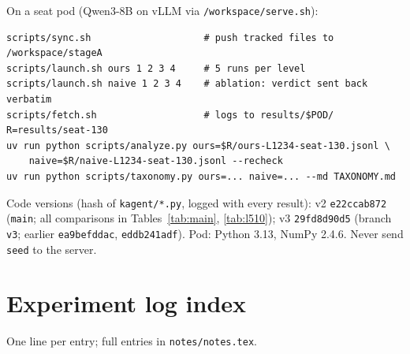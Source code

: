 \documentclass[11pt]{article}
\newcommand{\code}[1]{\texttt{#1}}
\begin{document}
\noindent On a seat pod (Qwen3-8B on vLLM via \code{/workspace/serve.sh}):

\begin{small}
\begin{verbatim}
scripts/sync.sh                    # push tracked files to /workspace/stageA
scripts/launch.sh ours 1 2 3 4     # 5 runs per level
scripts/launch.sh naive 1 2 3 4    # ablation: verdict sent back verbatim
scripts/fetch.sh                   # logs to results/$POD/
R=results/seat-130
uv run python scripts/analyze.py ours=$R/ours-L1234-seat-130.jsonl \
    naive=$R/naive-L1234-seat-130.jsonl --recheck
uv run python scripts/taxonomy.py ours=... naive=... --md TAXONOMY.md
\end{verbatim}
\end{small}

\noindent Code versions (hash of \code{kagent/*.py}, logged with every result): v2 \code{e22ccab872}
(\code{main}; all comparisons in Tables~\ref{tab:main}, \ref{tab:l510}); v3 \code{29fd8d90d5} (branch
\code{v3}; earlier \code{ea9befddac}, \code{eddb241adf}). Pod: Python 3.13, NumPy 2.4.6. Never send
\code{seed} to the server.

\clearpage
\appendix
\section{Experiment log index}
One line per entry; full entries in \code{notes/notes.tex}.
\end{document}
